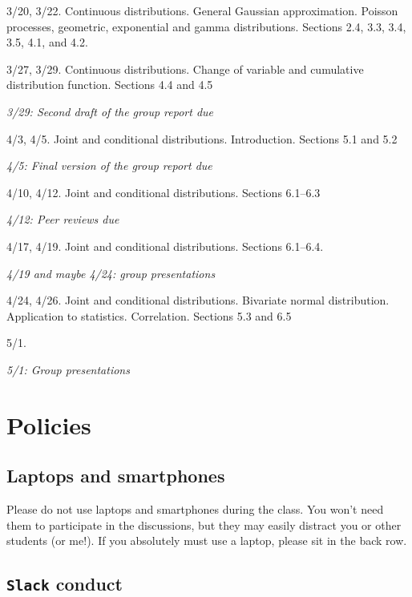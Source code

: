 \documentclass[oneside,11pt]{amsart}
\begin{document}
\begin{enumerate}[\bf{}{[}week 1{]}]
	\item 3/20, 3/22. Continuous distributions. General Gaussian approximation. 
		Poisson processes, geometric, exponential and gamma distributions. Sections 2.4, 3.3, 3.4, 3.5, 4.1, and 4.2.

	\item 3/27, 3/29. Continuous distributions. Change of variable and cumulative distribution function. Sections 4.4 and 4.5

		\emph{3/29: Second draft of the group report due}

	\item 4/3, 4/5. Joint and conditional distributions. Introduction. Sections 5.1 and 5.2
	
		\emph{4/5: Final version of the group report due}

	\item 4/10, 4/12. Joint and conditional distributions. 
		Sections 6.1--6.3

		\emph{4/12: Peer reviews due}
	
	\item 4/17, 4/19. Joint and conditional distributions. Sections 6.1--6.4.
		
		\emph{4/19 and maybe 4/24: group presentations}
	
	\item 4/24, 4/26. Joint and conditional distributions. Bivariate normal distribution. 
		Application to statistics. Correlation. Sections 5.3 and 6.5
	
	\item 5/1.

		\emph{5/1: Group presentations}
\end{enumerate}

\section{Policies}

\subsection{Laptops and smartphones}

Please do not use laptops and smartphones during the class.
You won't need them to participate in the discussions, but they may easily distract 
you or other students (or me!). If you absolutely must use a laptop, please sit in the back row.

\subsection{\texttt{Slack} conduct}
\end{document}
